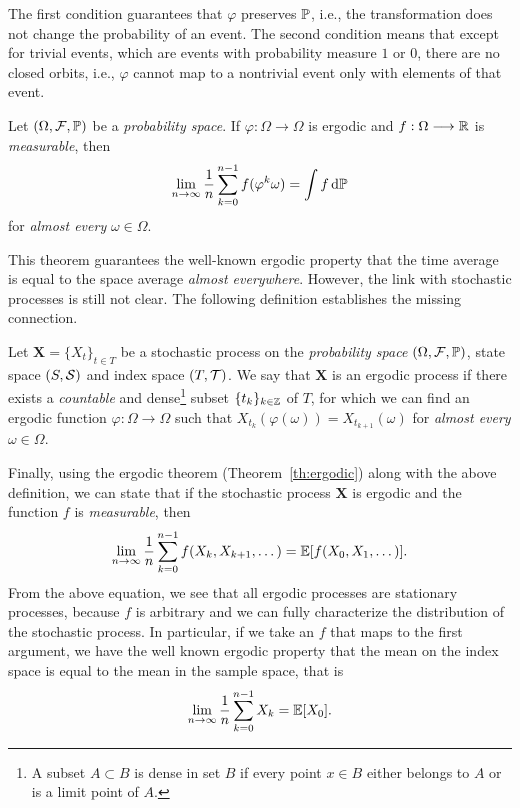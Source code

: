 The first condition guarantees that $\varphi$ preserves $\P$, i.e., the transformation does not change the probability of an event. The second condition means that except for trivial events, which are events with probability measure $1$ or $0$, there are no closed orbits, i.e., $\varphi$ cannot map to a nontrivial event only with elements of that event.

\begin{theorem} \label{th:ergodic}
    Let $(\Omega,\cal F, \P)$ be a \textit{probability space}. If $\varphi:\Omega\longrightarrow\Omega$ is ergodic and $f:\Omega\longrightarrow\R$ is \textit{measurable}, then
    \begin{align*}
        \lim_{n\to\infty} \frac{1}{n} \sum_{k=0}^{n-1} f(\varphi^{k}\omega) = \int f\,\d\P
    \end{align*}
    for \textit{almost every} $\omega\in\Omega$.
\end{theorem}

This theorem guarantees the well-known ergodic property that the time average is equal to the space average \textit{almost everywhere}.
%
However, the link with stochastic processes is still not clear. The following definition establishes the missing connection.

\begin{definition} \label{def:ergodic_process}
    Let $\bm{X} = \{X_t\}_{t\in T}$ be a stochastic process on the \textit{probability space} $(\Omega,\cal F, \P)$, state space $(S,\cal S)$ and index space $(T,\cal{T})$. We say that $\bm{X}$ is an ergodic process if there exists a \textit{countable} and dense\footnote{A subset $A\subset B$ is dense in set $B$ if every point $x\in B$ either belongs to $A$ or is a limit point of $A$.} subset $\{t_k\}_{k\in\Z}$ of $T$, for which we can find an ergodic function $\varphi:\Omega\longrightarrow\Omega$ such that $X_{t_k}(\varphi(\omega)) = X_{t_{k+1}}(\omega)$ for \textit{almost every} $\omega\in\Omega$.
\end{definition}

Finally, using the ergodic theorem (Theorem~\ref{th:ergodic}) along with the above definition, we can state that if the stochastic process $\bm{X}$ is ergodic and the function $f$ is \textit{measurable}, then
\begin{align*}
    \lim_{n\to\infty}\frac{1}{n}\sum_{k=0}^{n-1} f(X_k,X_{k+1},\dots) = \E[f(X_0,X_1,\dots)].
\end{align*}
%
From the above equation, we see that all ergodic processes are stationary processes, because $f$ is arbitrary and we can fully characterize the distribution of the stochastic process.
%
In particular, if we take an $f$ that maps to the first argument, we have the well known ergodic property that the mean on the index space is equal to the mean in the sample space, that is
\begin{align*}
    \lim_{n\to\infty}\frac{1}{n}\sum_{k=0}^{n-1} X_k = \E[X_0].
\end{align*}\vspace{-3mm}


